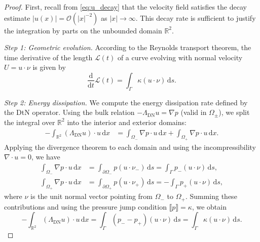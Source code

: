 \documentclass{article}
\theoremstyle{remark}
\theoremstyle{definition}
\numberwithin{equation}{section}
\begin{document}
\begin{proof}
    First, recall from \eqref{eq:u_decay} that the velocity field satisfies the decay estimate $|u(x)| = \mathcal{O}(|x|^{-2})$ as $|x| \to \infty$. 
    This decay rate is sufficient to justify the integration by parts on the unbounded domain $\mathbb{R}^2$.

    \textit{Step 1: Geometric evolution.}
    According to the Reynolds transport theorem, the time derivative of the length $\mathcal{L}(t)$ of a curve evolving with normal velocity $U = u \cdot \nu$ is given by
    \begin{equation}
        \frac{\mathrm{d}}{\mathrm{d}t} \mathcal{L}(t) = \int_{\Gamma} \kappa (u \cdot \nu) \, \mathrm{d}s.
        \label{eq:geo_rate}
    \end{equation}

    \textit{Step 2: Energy dissipation.}
    We compute the energy dissipation rate defined by the DtN operator.
    Using the bulk relation $-\Lambda_{\mathrm{DN}} u = \nabla p$ (valid in $\Omega_\pm$), we split the integral over $\mathbb{R}^2$ into the interior and exterior domains:
    \begin{align*}
        -\int_{\mathbb{R}^2} (\Lambda_{\mathrm{DN}} u) \cdot u \, \mathrm{d}x
        &= \int_{\Omega_-} \nabla p \cdot u \, \mathrm{d}x + \int_{\Omega_+} \nabla p \cdot u \, \mathrm{d}x.
    \end{align*}
    Applying the divergence theorem to each domain and using the incompressibility $\nabla \cdot u = 0$, we have
    \begin{align*}
        \int_{\Omega_-} \nabla p \cdot u \, \mathrm{d}x 
        &= \int_{\partial \Omega_-} p (u \cdot \nu_-) \, \mathrm{d}s = \int_{\Gamma} p_- (u \cdot \nu) \, \mathrm{d}s, \\
        \int_{\Omega_+} \nabla p \cdot u \, \mathrm{d}x 
        &= \int_{\partial \Omega_+} p (u \cdot \nu_+) \, \mathrm{d}s = -\int_{\Gamma} p_+ (u \cdot \nu) \, \mathrm{d}s,
    \end{align*}
    where $\nu$ is the unit normal vector pointing from $\Omega_-$ to $\Omega_+$.
    Summing these contributions and using the pressure jump condition $\llbracket p \rrbracket = \kappa$, we obtain
    \begin{equation}
        -\int_{\mathbb{R}^2} (\Lambda_{\mathrm{DN}} u) \cdot u \, \mathrm{d}x
        = \int_{\Gamma} (p_- - p_+) (u \cdot \nu) \, \mathrm{d}s
        = \int_{\Gamma} \kappa (u \cdot \nu) \, \mathrm{d}s.
        \label{eq:dissipation_rate}
    \end{equation}


\end{proof}
\end{document}
